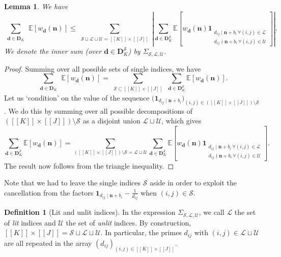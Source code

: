 \documentclass[11pt]{amsart}
\newtheorem{lemma}[theorem]{Lemma}
\theoremstyle{definition}
\newtheorem{definition}[theorem]{Definition}
\renewcommand{\leq}{\leqslant}
\newcommand{\sinterval}[1]{[\![#1]\!] }
\newcommand{\abs}[1]{\left|#1\right|}
\newcommand{\ind}[1]{\mathbf{1}_{#1}}
\newcommand{\E}{\mathbb{E}}
\renewcommand{\d}{\boldsymbol{d}}
\newcommand{\pcomp}[2]{d_{#1#2}}
\newcommand{\n}{\mathbf{n}}
\newcommand{\sommespart}{b}
\newcommand{\lit}{\mathcal{L}}
\newcommand{\unlit}{\mathcal{U}}
\newcommand{\s}{\mathcal{S}}
\newcommand{\fancyD}{\mathbf{D}}
\newcommand{\Dsf}{\fancyD_{\!\repK}}
\newcommand{\Ds}{\fancyD^{\s}_{\!\repK}}
\newcommand{\repK}{K}
\newcommand{\newK}{\sinterval{K}}
\newcommand{\newR}{\sinterval{J}}
\newcommand{\newerKR}{\newK\times\newR}
\begin{document}
\begin{lemma}
\label{lem:manip}
We have
\begin{equation*}
\sum_{\substack{\d\in \Dsf}}\,   \E \left[w_{\d}(\n) \right] 
\leq \sum_{\substack{\s\sqcup \lit\sqcup \unlit = \newerKR}}\abs{ \sum_{\d\in \Ds}  \E \left[w_{\d}(\n) \ind{\substack{\pcomp{i}{j}\mid \n+\sommespart_i \, \forall (i,j)\in \lit \\ \pcomp{i}{j}\nmid \n+\sommespart_i \, \forall (i,j)\in \unlit}} \right]}.
\end{equation*}
We denote the inner sum (over $\d\in \Ds$) by $\Sigma_{\s,\lit,\unlit}$.
\end{lemma}
\begin{proof}
Summing over all possible sets of single indices, we have
\begin{equation*}
	\sum_{\substack{\d\in \Dsf}}\,   \E \left[w_{\d}(\n) \right] = \sum_{\substack{\s\subset  \newerKR}} \,{ \sum_{\d\in \Ds}  \E \left[w_{\d}(\n) \right]}.
\end{equation*}
Let us `condition' on the value of the sequence $\big(\ind{\pcomp{i}{j}\mid \n+\sommespart_i}\big)_{(i,j)\in (\newerKR)\setminus \s}$. We do this by summing over all possible decompositions of $(\newerKR)\setminus \s$ as a disjoint union $\lit \sqcup \unlit$, which gives
\begin{equation*}
	\sum_{\d\in \Ds}  \E \left[w_{\d}(\n) \right] = \sum_{(\newerKR)\setminus \s = \lit \sqcup \unlit}  \sum_{\d\in \Ds} \E \left[w_{\d}(\n) \ind{\substack{\pcomp{i}{j}\mid \n+\sommespart_i \, \forall (i,j)\in \lit \\ \pcomp{i}{j}\nmid \n+\sommespart_i \, \forall (i,j)\in \unlit}} \right].
\end{equation*}
The result now follows from the triangle inequality.
\end{proof}

Note that we had to leave the single indices $\s$ aside in order to exploit the cancellation from the factors $\ind{\pcomp{i}{j}\mid \n+\sommespart_i} - \frac{1}{\pcomp{i}{j}}$ when $(i,j)\in \s$.


\begin{definition}[Lit and unlit indices]
\label{def:litunlit}
In the expression $\Sigma_{\s,\lit,\unlit}$, we call $\lit$ the set of \emph{lit} indices and $\unlit$ the set of \emph{unlit} indices. By construction, $\newerKR = \s\sqcup\lit\sqcup \unlit$. In particular, the primes $\pcomp{i}{j}$ with $(i,j) \in \lit \sqcup \unlit$ are all repeated in the array $(\pcomp{i}{j})_{(i,j)\in\newerKR}$.
\end{definition}
\end{document}
